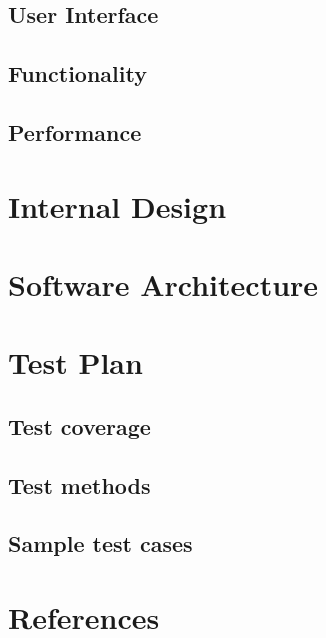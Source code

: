 \documentclass[a4paper,11pt]{article}
\begin{document}
\subsection{User Interface}

\subsection{Functionality}

\subsection{Performance}

\section{Internal Design}

\section{Software Architecture}

\section{Test Plan}

\subsection{Test coverage}

\subsection{Test methods}

\subsection{Sample test cases}

\section{References}
\end{document}
